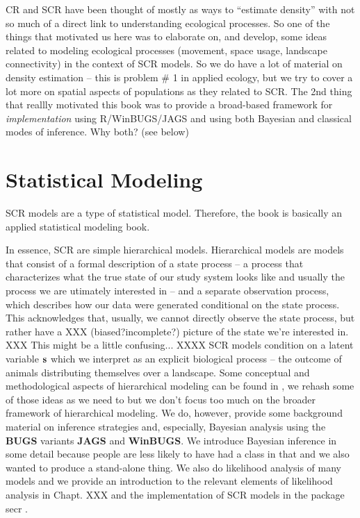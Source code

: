 CR and SCR have been thought of mostly as ways to ``estimate density''
with not so much of a direct link to understanding ecological
processes. So one of the things that motivated us here was to
elaborate on, and develop, some ideas related to modeling ecological
processes (movement, space usage, landscape connectivity) in the
context of SCR models. 
So we do have a lot of material on density estimation -- this is
problem \# 1 in applied ecology, but we try to cover a lot more on
spatial aspects of populations as they related to SCR.
The 2nd thing that reallly motivated this book was to provide a
broad-based framework for {\it implementation} using R/WinBUGS/JAGS and
using both Bayesian and classical modes of inference. 
Why both? (see below) 

\section*{Statistical Modeling}

SCR models are a type of statistical model. Therefore, 
the book is basically an applied statistical modeling book.

In essence, SCR
are simple hierarchical models. 
Hierarchical models are models that consist of a formal description of a state process -- a process that characterizes what the true state of our study system looks like and usually the process we are utimately interested in -- and a separate observation process, which describes how our data were generated conditional on the state process. This acknowledges that, usually, we cannot directly observe the state process, but rather have a XXX (biased?incomplete?) picture of the state we're interested in. XXX This might be a little confusing... XXXX
SCR models condition on a latent variable ${\bf s}$ which we interpret
as an explicit biological process -- the outcome of animals
distributing themselves over a landscape.  Some conceptual and
methodological aspects of hierarchical modeling can be found in
\citet{royle_dorazio:2008}, we rehash some of those ideas as we need
to but we don't focus too much on the broader framework of
hierarchical modeling.
We do, however, 
 provide some background material on inference strategies and,
 especially, Bayesian analysis using the  {\bf BUGS} variants {\bf
   JAGS} and {\bf WinBUGS}. We introduce Bayesian inference in some
 detail because people are less likely to have had a class in that and
 we also wanted to produce a stand-alone thing.   We also do
 likelihood analysis of many models and we provide an introduction to
 the relevant elements of likelihood analysis in Chapt. XXX and the
 implementation of SCR models in the package secr \citep{efford_etal:2009euring}.

